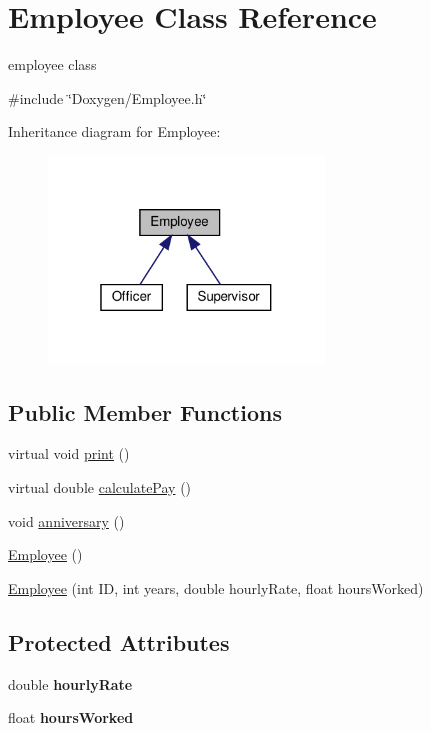 \hypertarget{classEmployee}{}\section{Employee Class Reference}
\label{classEmployee}


employee class  




{\ttfamily \#include \char`\"{}Doxygen/\+Employee.\+h\char`\"{}}



Inheritance diagram for Employee\+:\nopagebreak
\begin{figure}[H]
\begin{center}
\leavevmode
\includegraphics[width=208pt]{classEmployee__inherit__graph}
\end{center}
\end{figure}
\subsection*{Public Member Functions}
\begin{DoxyCompactItemize}
\item 
virtual void \hyperlink{classEmployee_a79556ad700627dba88049f487a34a762}{print} ()
\item 
virtual double \hyperlink{classEmployee_a01c2c44e15434237db28832f6972e960}{calculate\+Pay} ()
\item 
void \hyperlink{classEmployee_a67c345031cf63f515fb09dc675dee5f3}{anniversary} ()
\item 
\hyperlink{classEmployee_a003c7bd08c40924e381eb0750cbb906f}{Employee} ()
\item 
\hyperlink{classEmployee_ad0c935ef9a290a82dcf7865172c90148}{Employee} (int ID, int years, double hourly\+Rate, float hours\+Worked)
\end{DoxyCompactItemize}
\subsection*{Protected Attributes}
\begin{DoxyCompactItemize}
\item 
\mbox{\label{classEmployee_ac31134abb9b4004fc015e51ef579b069}} 
double {\bfseries hourly\+Rate}
\item 
\mbox{\label{classEmployee_afde35c73d02eb1cfe89e23a80998b42e}} 
float {\bfseries hours\+Worked}
\end{DoxyCompactItemize}
